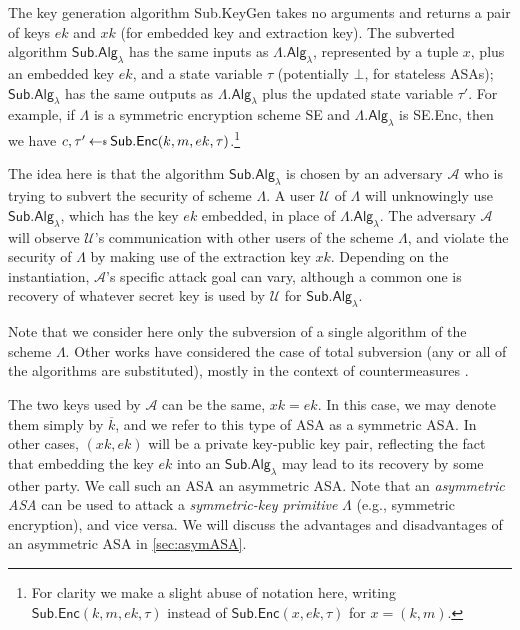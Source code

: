 The key generation algorithm \textsf{Sub.KeyGen} takes no arguments and returns a pair of keys $ek$ and $xk$ (for embedded key and extraction key). The subverted algorithm $\mathsf{Sub.Alg}_\lambda$ has the same inputs as $\mathsf{\Lambda.Alg}_\lambda$, represented by a tuple $x$, plus an embedded key $ek$, and a state variable $\tau$ (potentially $\bot$, for stateless ASAs); $\mathsf{Sub.Alg}_\lambda$ has the same outputs as $\mathsf{\Lambda.Alg}_\lambda$ plus the updated state variable $\tau'$. For example, if $\mathsf{\Lambda}$ is a symmetric encryption scheme \textsf{SE} and $\mathsf{\Lambda.Alg}_\lambda$ is \textsf{SE.Enc}, then we have $c, \tau' \sample \mathsf{Sub.Enc}(k, m, ek, \tau)$.\footnote{For clarity we make a slight abuse of notation here, writing $\mathsf{Sub.Enc}(k, m, ek, \tau)$ instead of $\mathsf{Sub.Enc}(x, ek, \tau)$ for $x=(k, m)$.}

The idea here is that the algorithm $\mathsf{Sub.Alg}_\lambda$ is chosen by an adversary $\mathcal{A}$ who is trying to subvert the security of scheme $\mathsf{\Lambda}$. A user $\mathcal{U}$ of $\mathsf{\Lambda}$ will unknowingly use $\mathsf{Sub.Alg}_\lambda$, which has the key $ek$ embedded, in place of $\mathsf{\Lambda.Alg}_\lambda$. The adversary $\mathcal{A}$ will observe $\mathcal{U}$'s communication with other users of the scheme $\mathsf{\Lambda}$, and violate the security of $\mathsf{\Lambda}$ by making use of the extraction key $xk$. Depending on the instantiation, $\mathcal{A}$'s specific attack goal can vary, although a common one is recovery of whatever secret key is used by $\mathcal{U}$ for $\mathsf{Sub.Alg}_\lambda$.

Note that we consider here only the subversion of a single algorithm of the scheme $\Lambda$. Other works have considered the case of total subversion (any or all of the algorithms are substituted), mostly in the context of countermeasures \cite{ACNS:AFMV19,CCS:RTYZ17,AC:RTYZ16}.

The two keys used by $\mathcal{A}$ can be the same, $xk=ek$. In this case, we may denote them simply by $\overline{k}$, and we refer to this type of ASA as a symmetric ASA. In other cases, $(xk,ek)$ will be a private key-public key pair, reflecting the fact that embedding the key $ek$ into an $\mathsf{Sub.Alg}_\lambda$ may lead to its recovery by some other party. We call such an ASA an asymmetric ASA. Note that an \emph{asymmetric ASA} can be used to attack a \emph{symmetric-key primitive} $\mathsf{\Lambda}$ (e.g., symmetric encryption), and vice versa. We will discuss the advantages and disadvantages of an asymmetric ASA in \autoref{sec:asymASA}.

